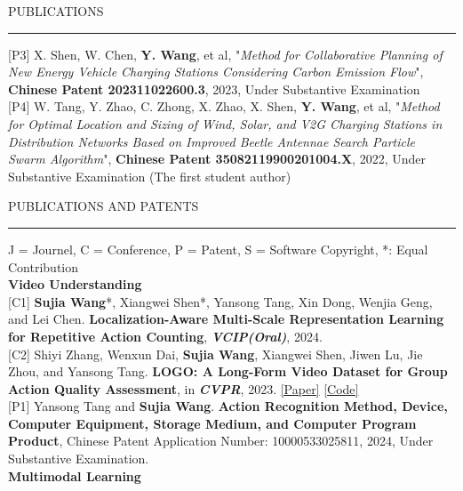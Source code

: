 \documentclass{resume} %
\renewenvironment{rSection}[1]{
\sectionskip
\textcolor{TsinghuaPurple}{\MakeUppercase{#1}}
\sectionlineskip
\hrule
\begin{list}{}{
\setlength{\leftmargin}{0em}
}
\item[]
}{
\end{list}
}
\begin{document}
\begin{rSection}{ Publications }
{[P3] X. Shen, W. Chen, \textbf{Y. Wang}, et al, "\textit{Method for Collaborative Planning of New Energy Vehicle Charging Stations Considering Carbon Emission Flow}", \textbf{Chinese Patent 202311022600.3}}, 2023, Under Substantive Examination\\
{[P4] W. Tang, Y. Zhao, C. Zhong, X. Zhao, X. Shen, \textbf{Y. Wang}, et al, "\textit{Method for Optimal Location and Sizing of Wind, Solar, and V2G Charging Stations in Distribution Networks Based on Improved Beetle Antennae Search Particle Swarm Algorithm}", \textbf{Chinese Patent 35082119900201004.X}}, 2022, Under Substantive Examination (The first student author)
\end{rSection}
\fi
\begin{rSection}{Publications and Patents}
    \vspace{-3pt}
    \textcolor{darkpurple}{\normalsize{J = Journel, C = Conference, P = Patent, S = Software Copyright, *: Equal Contribution}}\vspace{7pt}\\  
\textbf{\large{\textcolor{darkpurple}{Video Understanding}}}\vspace{5pt}\\
{\label{c1}[C1] \textbf{Sujia Wang}*, Xiangwei Shen*, Yansong Tang, Xin Dong, Wenjia Geng, and Lei Chen. \textbf{Localization-Aware Multi-Scale Representation Learning for Repetitive Action Counting}, \textit{\textbf{VCIP(Oral)}}, 2024.}\vspace{3pt}\\
{\label{c2}[C2] Shiyi Zhang, Wenxun Dai, \textbf{Sujia Wang}, Xiangwei Shen, Jiwen Lu, Jie Zhou, and Yansong Tang. \textbf{LOGO: A Long-Form Video Dataset for Group Action Quality Assessment}, in \textit{\textbf{CVPR}}, 2023. \href{https://openaccess.thecvf.com/content/CVPR2023/papers/Zhang_LOGO_A_Long-Form_Video_Dataset_for_Group_Action_Quality_Assessment_CVPR_2023_paper.pdf}{[Paper]} \href{https://github.com/shiyi-zh0408/LOGO}{[Code]}}\vspace{3pt}\\
{\label{p1}[P1] Yansong Tang and \textbf{Sujia Wang}. \textbf{Action Recognition Method, Device, Computer Equipment, Storage Medium, and Computer Program Product}, Chinese Patent Application Number: 10000533025811, 2024, Under Substantive Examination.}\vspace{7pt}\\
\textbf{\large{\textcolor{darkpurple}{Multimodal Learning}}}\vspace{5pt}\\

\end{rSection}
\end{document}
